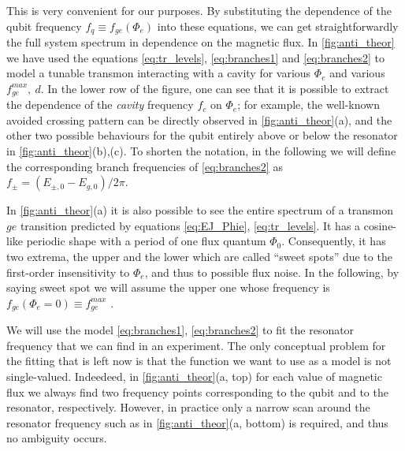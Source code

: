 \documentclass[%
 aip,
 amsmath,amssymb,
 reprint,%
]{revtex4-1}
\begin{document}
This is very convenient for our purposes. By substituting the dependence of the qubit frequency $f_q \equiv f_{ge}(\Phi_e)$ into these equations, we can get straightforwardly the full system spectrum in dependence on the magnetic flux. In \autoref{fig:anti_theor} we have used the equations \eqref{eq:tr_levels}, \eqref{eq:branches1} and \eqref{eq:branches2} to model a tunable transmon interacting with a cavity for various $\Phi_e$ and various $f_{ge}^{max},\ d$. In the lower row of the figure, one can see that it is possible to extract the dependence of the \textit{cavity} frequency $f_c$ on $\Phi_e$; for example, the well-known avoided crossing pattern can be directly observed in \autoref{fig:anti_theor}(a), and the other two possible behaviours for the qubit entirely above or below the resonator in \autoref{fig:anti_theor}(b),(c). To shorten the notation, in the following we will define the corresponding branch frequencies of \eqref{eq:branches2} as $f_{\pm} = ( E_{\pm,0}-E_{g,0})/2\pi$.

In \autoref{fig:anti_theor}(a) it is also possible to see the entire spectrum of a transmon $ge$ transition predicted by equations \eqref{eq:EJ_Phie}, \eqref{eq:tr_levels}. It has a cosine-like periodic shape with a period of one flux quantum $\Phi_0$. Consequently, it has two extrema, the upper and the lower which are called ``sweet spots'' due to the first-order insensitivity to $\Phi_e$, and thus to possible flux noise. In the following, by saying sweet spot we will assume the upper one whose frequency is $f_{ge}(\Phi_e = 0) \equiv f^{max}_{ge}$ .

We will use the model \eqref{eq:branches1}, \eqref{eq:branches2} to fit the resonator frequency that we can find in an experiment. The only conceptual problem for the fitting that is left now is that the function we want to use as a model is not single-valued. Indeedeed, in \autoref{fig:anti_theor}(a, top) for each value of magnetic flux we always find two frequency points corresponding to the qubit and to the resonator, respectively. However, in practice only a narrow scan around the resonator frequency such as in \autoref{fig:anti_theor}(a, bottom) is required, and thus no ambiguity occurs. 

\end{document}
